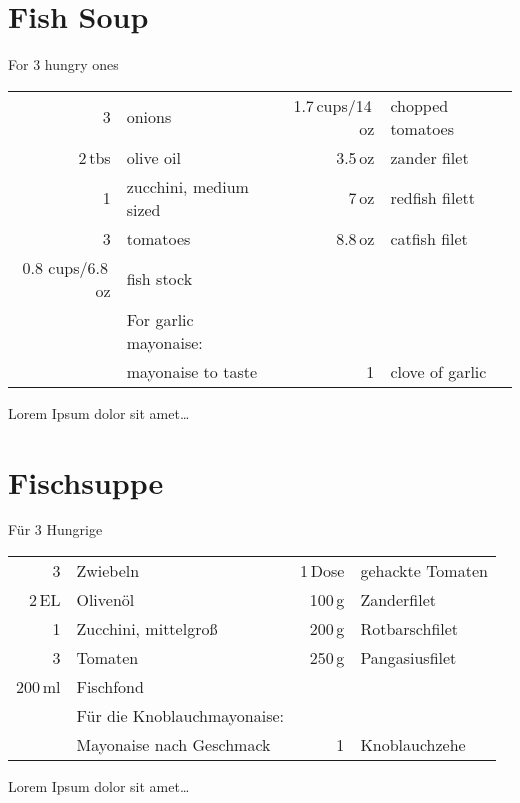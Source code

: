 \section{Fish Soup}
\begin{centering}
For 3 hungry ones
\end{centering}
\begin{table}[H]
\centering
\begin{tabular*}{1\textwidth}{rlrl}
3 & onions & 1.7\,cups/14\,oz & chopped tomatoes \\
2\,tbs & olive oil &3.5\,oz & zander filet\\
1 & zucchini, medium sized & 7\,oz & redfish filett\\
3 & tomatoes & 8.8\,oz & catfish filet\\
0.8 cups/6.8\,oz & fish stock && \\
&For garlic mayonaise:&&\\
& mayonaise to taste & 1 & clove of garlic\\
\end{tabular*}
\end{table}
Lorem Ipsum dolor sit amet\ldots


\section*{Fischsuppe}
\begin{centering}
F\"{u}r 3 Hungrige
\end{centering}
\begin{table}[H]
\centering
\begin{tabular*}{1\textwidth}{rlrl}
3 & Zwiebeln & 1\,Dose & gehackte Tomaten\\
2\,EL & Olivenöl &100\,g & Zanderfilet\\
1 & Zucchini, mittelgroß & 200\,g & Rotbarschfilet\\
3 & Tomaten & 250\,g & Pangasiusfilet\\
200\,ml & Fischfond && \\
&Für die Knoblauchmayonaise:&&\\
& Mayonaise nach Geschmack & 1 & Knoblauchzehe\\
\end{tabular*}
\end{table}
Lorem Ipsum dolor sit amet\ldots

